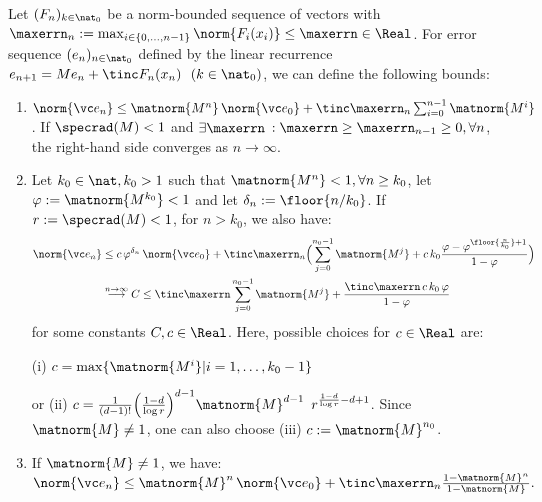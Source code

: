 \begin{thm}\label{thm:normboundsboundeddisturbmainbody}
Let $(F_n)_{k \in \nat_0}$ be a norm-bounded sequence of vectors with $\maxerrn_n :=\max_{i \in \{0,\ldots,n-1\}} \norm{F_i(x_i)} \leq \maxerrn \in \Real$. 
For error sequence $(e_n)_{n \in \nat_0}$ defined by the linear recurrence 
	$e_{n+1}  = M e_n + \tinc F_n(x_n) \,\,\,\, (k \in \nat_0)$, we can define the following bounds:
	
	\begin{enumerate}
	\item $\norm{\vc e_n} \leq \matnorm{M^{n}} \, \norm{\vc e_0} + \tinc \maxerrn_{n} \sum_{i=0}^{n-1}  \matnorm{M^{i}}$. If $\specrad(M) <1$ and $\exists \maxerrn$ $:\maxerrn\geq \maxerrn_{n-1} \geq 0, \forall n$, the right-hand side converges as $n \to \infty$.
	\item Let $k_0 \in \nat, k_0 >1$ such that $\matnorm{M^n} <1, \forall n \geq k_0$, let $\varphi := \matnorm{M^{k_0}} <1$ and let $\delta_n := \floor{n/k_0}$. If $r:=\specrad(M) < 1$, for $n > k_0$,  we also have:
	\begin{align*} \norm{\vc e_n} &\leq c \, \varphi^{\delta_n} \, \norm{\vc e_0} + \tinc \maxerrn_{n} \Bigl(\sum_{j=0}^{n_0-1} \matnorm{M^j} + c \, k_0 \frac{\varphi-\varphi^{ \floor{\frac{n}{k_0}}+1 }}{1-\varphi} \Bigr)\\
	& \stackrel{n \to \infty}{\longrightarrow} C \leq \tinc \maxerrn \sum_{j=0}^{n_0-1} \matnorm{M^j} 
	+ \frac{\tinc \maxerrn\,  c\, k_0 \,\varphi}{1-\varphi} 
	\end{align*} 
	for some constants $C,c \in \Real$.
	Here, possible choices for $c \in \Real$ are: 
	
(i) $c= \max\{\matnorm{M^i} | i=1,\ldots,k_0-1 \}$ 

or (ii) $c = \frac{1}{(d-1)!} \Bigl(\frac{1 - d}{\log r}\Bigr)^{d-1}	\matnorm{M}^{d-1}\, \, \, r^{\frac{1 - d}{\log r}-d+1}  $.
%
Since $\matnorm{M} \neq 1$, one can also choose (iii) $c:= \matnorm{M}^{n_0}$. %

\item If $\matnorm{M} \neq 1$, we have: \newline
$\norm{\vc e_n} \leq \matnorm{M}^{n} \, \norm{\vc e_0} + \tinc \maxerrn_{n}   \frac{1-\matnorm{M}^n}{1-\matnorm{M}}. $
	\end{enumerate}
%
\end{thm}



